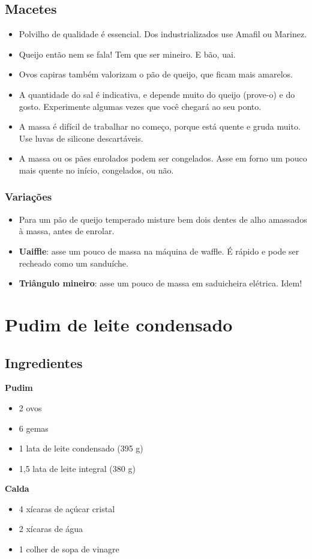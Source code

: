 \subsection*{Macetes}
\begin{itemize}
\item Polvilho de qualidade é essencial. Dos industrializados use Amafil ou Marinez.
\item Queijo então nem se fala! Tem que ser mineiro. E bão, uai.
\item Ovos capiras também valorizam o pão de queijo, que ficam mais amarelos.
\item A quantidade do sal é indicativa, e depende muito do queijo (prove-o) e do gosto. Experimente algumas vezes que você chegará ao seu ponto.
\item A massa é difícil de trabalhar no começo, porque está quente e gruda muito. Use luvas de silicone descartáveis.
\item A massa ou os pães enrolados podem ser congelados. Asse em forno um pouco mais quente no início, congelados, ou não.
\end{itemize}

\subsubsection*{Variações}
\begin{itemize}
\item Para um pão de queijo temperado misture bem dois dentes de alho amassados à massa, antes de enrolar.
\item \textbf{Uaiffle}: asse um pouco de massa na máquina de waffle. É rápido e pode ser recheado como um sanduíche.
\item \textbf{Triângulo mineiro}: asse um pouco de massa em saduicheira elétrica. Idem!
\end{itemize}
\section{Pudim de leite condensado}
\subsection{Ingredientes}
\textbf{Pudim}
\begin{itemize}
\item 2 ovos
\item 6 gemas
\item 1 lata de leite condensado (395 g)
\item 1,5 lata de leite integral (380 g)
\end{itemize}
\textbf{Calda}
\begin{itemize}
\item 4 xícaras de açúcar cristal
\item 2 xícaras de água
\item 1 colher de sopa de vinagre
\end{itemize}
